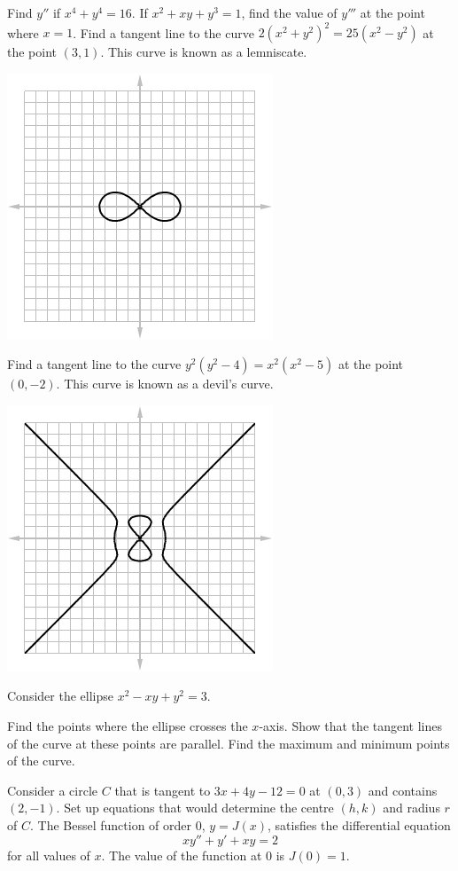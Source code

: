 \begin{questions}
\begin{center}
            \end{center}
  \questioM Find $ y'' $ if $ x^4 + y^4 = 16$.
  \questioM If $ x^2 + xy + y^3 = 1 $, find the value of $ y''' $ at the point where $ x = 1 $.
  \clearpage
  \questioM Find a tangent line to the curve $ 2(x^2 + y^2)^2 = 25(x^2 - y^2) $ at the point $ (3, 1) $. This curve is known
            as a lemniscate.
            \begin{center}
              \includegraphics[width=0.3\linewidth]{lemniscate}
            \end{center}
  \questioM Find a tangent line to the curve $ y^2(y^2 - 4) = x^2(x^2 - 5) $ at the point $ (0, -2) $. This curve is known
            as a devil's curve.
            \begin{center}
              \includegraphics[width=0.3\linewidth]{devilcurve}
            \end{center}
  \question Consider the ellipse $ x^2 - xy + y^2 = 3 $.
    \begin{parts}
      \parA Find the points where the ellipse crosses the $ x$-axis.
      \parM Show that the tangent lines of the curve at these points are parallel.
      \parE Find the maximum and minimum points of the curve.
    \end{parts}
  \questioE Consider a circle $ C $ that is tangent to $ 3x + 4y - 12 = 0 $ at $ (0, 3) $ and contains $ (2, -1) $. Set
            up equations that would determine the centre $ (h,k) $ and radius $ r $ of $ C $.
  \questioS The Bessel function of order 0, $ y = J(x) $, satisfies the differential equation
            \begin{displaymath}
              xy'' + y' + xy = 2
            \end{displaymath}
            for all values of $ x $. The value of the function at 0 is $ J(0) = 1 $.
    \begin{parts}

\end{parts}
\end{questions}
